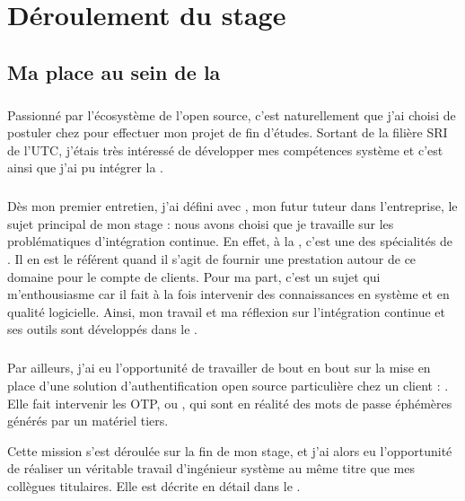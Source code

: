 \chapter{Déroulement du stage}

\section{Ma place au sein de la \abusys}

\paragraph{}
Passionné par l'écosystème de l'open source, c'est naturellement que j'ai choisi de postuler chez \asmile{} pour effectuer mon projet de fin d'études.
Sortant de la filière SRI de l'UTC, j'étais très intéressé de développer mes compétences système et c'est ainsi que j'ai pu intégrer la \abusys{}.

\paragraph{}
Dès mon premier entretien, j'ai défini avec \agulet{}, mon futur tuteur dans l'entreprise, le sujet principal de mon stage : nous avons choisi que je travaille sur les problématiques d'intégration continue.
En effet, à la \abusys{}, c'est une des spécialités de \agulet{}.
Il en est le référent quand il s'agit de fournir une prestation autour de ce domaine pour le compte de clients.
Pour ma part, c'est un sujet qui m'enthousiasme car il fait à la fois intervenir des connaissances en système et en qualité logicielle.
Ainsi, mon travail et ma réflexion sur l'intégration continue et ses outils sont développés dans le .

\paragraph{}
Par ailleurs, j'ai eu l'opportunité de travailler de bout en bout sur la mise en place d'une solution d'authentification open source particulière chez un client : \alinotp.
Elle fait intervenir les OTP, ou , qui sont en réalité des mots de passe éphémères générés par un matériel tiers.

Cette mission s'est déroulée sur la fin de mon stage, et j'ai alors eu l'opportunité de réaliser un véritable travail d'ingénieur système au même titre que mes collègues titulaires.
Elle est décrite en détail dans le  .

